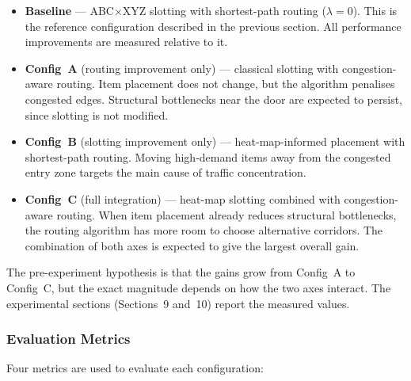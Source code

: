\documentclass[12pt,a4paper]{article}
\begin{document}
\begin{itemize}
  \item \textbf{Baseline} --- ABC$\times$XYZ slotting with shortest-path routing
    ($\lambda = 0$). This is the reference configuration described in the previous
    section. All performance improvements are measured relative to it.
  \item \textbf{Config~A} (routing improvement only) --- classical slotting with
    congestion-aware routing. Item placement does not change, but the algorithm
    penalises congested edges. Structural bottlenecks near the door are expected
    to persist, since slotting is not modified.
  \item \textbf{Config~B} (slotting improvement only) --- heat-map-informed placement
    with shortest-path routing. Moving high-demand items away from the congested
    entry zone targets the main cause of traffic concentration.
  \item \textbf{Config~C} (full integration) --- heat-map slotting combined with
    congestion-aware routing. When item placement already reduces structural
    bottlenecks, the routing algorithm has more room to choose alternative
    corridors. The combination of both axes is expected to give the largest
    overall gain.
\end{itemize}

The pre-experiment hypothesis is that the gains grow from Config~A to Config~C,
but the exact magnitude depends on how the two axes interact. The experimental
sections (Sections~9 and~10) report the measured values.

\subsubsection{Evaluation Metrics}

Four metrics are used to evaluate each configuration:
\end{document}
